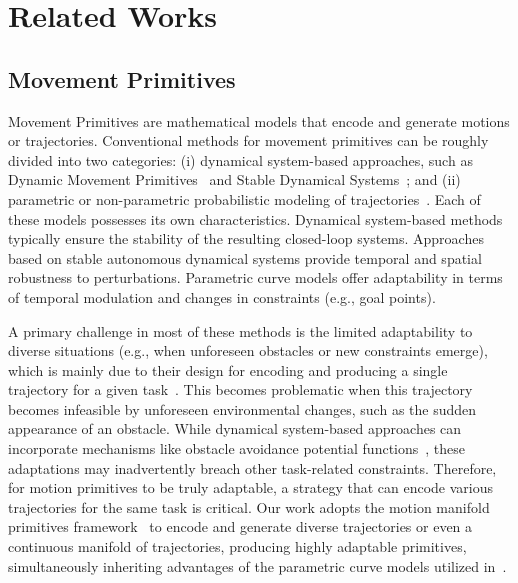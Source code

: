 \section{Related Works}
\label{sec:rw}

\subsection{Movement Primitives}
Movement Primitives are mathematical models that encode and generate motions or trajectories. Conventional methods for movement primitives can be roughly divided into two categories: (i) dynamical system-based approaches, such as Dynamic Movement Primitives~\cite{ijspeert2013dynamical, schaal2007dynamics, pervez2017novel, fanger2016gaussian, umlauft2017bayesian, pervez2017learning} and Stable Dynamical Systems~\cite{khansari2011learning, neumann2013neural, neumann2015learning, blocher2017learning, sindhwani2018learning, kolter2019learning}; and (ii) parametric or non-parametric probabilistic modeling of trajectories~\cite{paraschos2013probabilistic, zhou2019learning, huang2019kernelized}. Each of these models possesses its own characteristics. Dynamical system-based methods typically ensure the stability of the resulting closed-loop systems. Approaches based on stable autonomous dynamical systems provide temporal and spatial robustness to perturbations. Parametric curve models offer adaptability in terms of temporal modulation and changes in constraints (e.g., goal points). 

A primary challenge in most of these methods is the limited adaptability to diverse situations (e.g., when unforeseen obstacles or new constraints emerge), which is mainly due to their design for encoding and producing a single trajectory for a given task~\cite{lee2023equivariant}.  
This becomes problematic when this trajectory becomes infeasible by unforeseen environmental changes, such as the sudden appearance of an obstacle. 
While dynamical system-based approaches can incorporate mechanisms like obstacle avoidance potential functions~\cite{park2008movement, hoffmann2009biologically, khansari2012dynamical, ginesi2019dynamic}, these adaptations may inadvertently breach other task-related constraints. Therefore, for motion primitives to be truly adaptable, a strategy that can encode various trajectories for the same task is critical. 
Our work adopts the motion manifold primitives framework~\cite{noseworthy2020task, lee2023equivariant} to encode and generate diverse trajectories or even a continuous manifold of trajectories, producing highly adaptable primitives, simultaneously inheriting advantages of the parametric curve models utilized in~\cite{paraschos2013probabilistic, zhou2019learning}.

